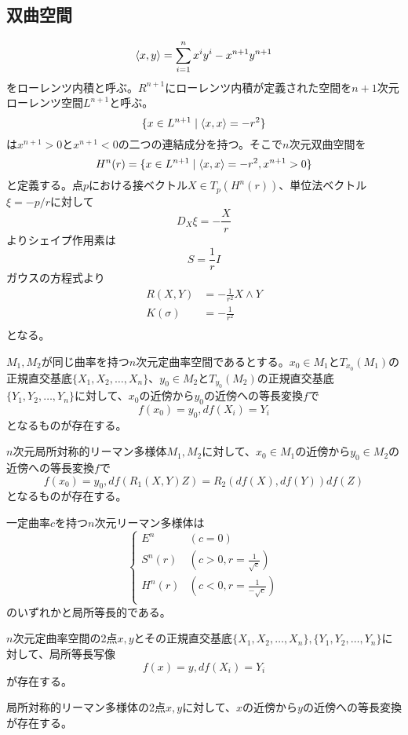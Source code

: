     \subsection{双曲空間}
            \[\langle x, y\rangle = \sum_{i=1}^n x^iy^i - x^{n+1}y^{n+1}\]
        をローレンツ内積と呼ぶ。$R^{n+1}$にローレンツ内積が定義された空間を$n+1$次元ローレンツ空間$L^{n+1}$と呼ぶ。
            \[\{x \in L^{n+1} \mid \langle x, x\rangle = -r^2\}\]
        は$x^{n+1} > 0$と$x^{n+1} < 0$の二つの連結成分を持つ。そこで$n$次元双曲空間を
            \[H^n(r) = \{x \in L^{n+1} \mid \langle x, x\rangle = -r^2, x^{n+1} > 0\}\]
        と定義する。点$p$における接ベクトル$X \in T_p(H^n(r))$、単位法ベクトル$\xi = -p/r$に対して
            \[D_X\xi = -\frac{X}{r}\]
        よりシェイプ作用素は
            \[S = \frac{1}{r}I\]
        ガウスの方程式より
        \begin{align*}
            R(X, Y) &= -\frac{1}{r^2}X \wedge Y\\
            K(\sigma) &= -\frac{1}{r^2}\\
        \end{align*}
        となる。

    \begin{thm}
        $M_1, M_2$が同じ曲率を持つ$n$次元定曲率空間であるとする。$x_0 \in M_1$と$T_{x_0}(M_1)$の正規直交基底$\{X_1, X_2, \dots, X_n\}$、$y_0 \in M_2$と$T_{y_0}(M_2)$の正規直交基底$\{Y_1, Y_2, \dots, Y_n\}$に対して、$x_0$の近傍から$y_0$の近傍への等長変換$f$で
            \[f(x_0) = y_0, df(X_i) = Y_i\]
        となるものが存在する。
    \end{thm}
    \begin{thm}
        $n$次元局所対称的リーマン多様体$M_1, M_2$に対して、$x_0 \in M_1$の近傍から$y_0 \in M_2$の近傍への等長変換$f$で
            \[f(x_0) = y_0, df(R_1(X, Y)Z) = R_2(df(X), df(Y))df(Z)\]
        となるものが存在する。
    \end{thm}
    \begin{cor}
        一定曲率$c$を持つ$n$次元リーマン多様体は
        \[\begin{cases}
            E^n & (c = 0)\\
            S^n(r) & (c > 0, r = \frac{1}{\sqrt{c}})\\
            H^n(r) & (c < 0, r = \frac{1}{-\sqrt{c}})\\
        \end{cases}\]
        のいずれかと局所等長的である。
    \end{cor}
    \begin{cor}
        $n$次元定曲率空間の2点$x, y$とその正規直交基底$\{X_1, X_2, \dots, X_n\}, \{Y_1, Y_2, \dots, Y_n\}$に対して、局所等長写像
            \[f(x) = y, df(X_i) = Y_i\]
        が存在する。
    \end{cor}
    \begin{cor}
        局所対称的リーマン多様体の2点$x, y$に対して、$x$の近傍から$y$の近傍への等長変換が存在する。
    \end{cor}